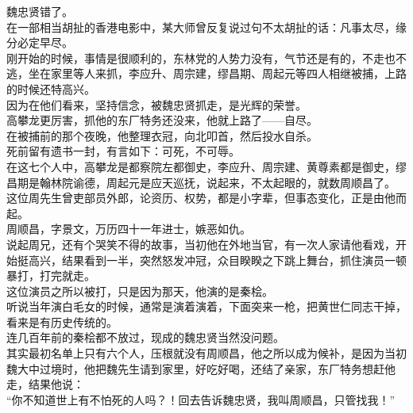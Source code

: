 \begin{multicols}{\theparacolNo}
魏忠贤错了。\\

在一部相当胡扯的香港电影中，某大师曾反复说过句不太胡扯的话：凡事太尽，缘分必定早尽。\\

刚开始的时候，事情是很顺利的，东林党的人势力没有，气节还是有的，不走也不逃，坐在家里等人来抓，李应升、周宗建，缪昌期、周起元等四人相继被捕，上路的时候还特高兴。\\

因为在他们看来，坚持信念，被魏忠贤抓走，是光辉的荣誉。\\

高攀龙更厉害，抓他的东厂特务还没来，他就上路了——自尽。\\

在被捕前的那个夜晚，他整理衣冠，向北叩首，然后投水自杀。\\

死前留有遗书一封，有言如下：可死，不可辱。\\

在这七个人中，高攀龙是都察院左都御史，李应升、周宗建、黄尊素都是御史，缪昌期是翰林院谕德，周起元是应天巡抚，说起来，不太起眼的，就数周顺昌了。\\

这位周先生曾吏部员外郎，论资历、权势，都是小字辈，但事态变化，正是由他而起。\\

周顺昌，字景文，万历四十一年进士，嫉恶如仇。\\

说起周兄，还有个哭笑不得的故事，当初他在外地当官，有一次人家请他看戏，开始挺高兴，结果看到一半，突然怒发冲冠，众目睽睽之下跳上舞台，抓住演员一顿暴打，打完就走。\\

这位演员之所以被打，只是因为那天，他演的是秦桧。\\

听说当年演白毛女的时候，通常是演着演着，下面突来一枪，把黄世仁同志干掉，看来是有历史传统的。\\

连几百年前的秦桧都不放过，现成的魏忠贤当然没问题。\\

其实最初名单上只有六个人，压根就没有周顺昌，他之所以成为候补，是因为当初魏大中过境时，他把魏先生请到家里，好吃好喝，还结了亲家，东厂特务想赶他走，结果他说：\\

“你不知道世上有不怕死的人吗？！回去告诉魏忠贤，我叫周顺昌，只管找我！”\\


\end{multicols}
